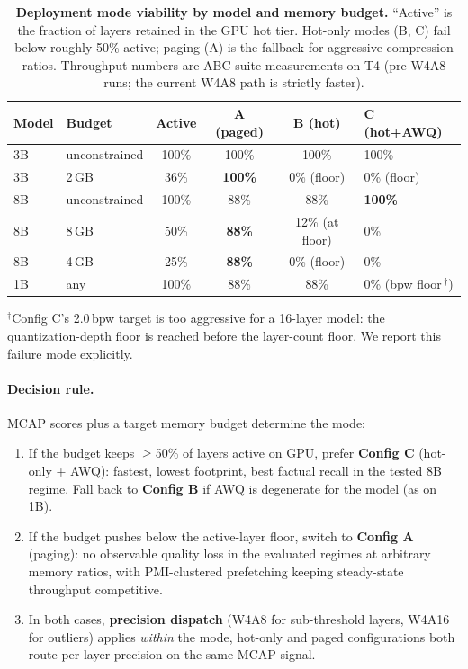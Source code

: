 \documentclass{article}
\begin{document}
\begin{table}[H]
\centering
\caption{\textbf{Deployment mode viability by model and memory budget.} ``Active'' is
the fraction of layers retained in the GPU hot tier. Hot-only modes (B, C) fail below
roughly 50\% active; paging (A) is the fallback for aggressive compression
ratios. Throughput numbers are ABC-suite measurements on T4 (pre-W4A8 runs;
the current W4A8 path is strictly faster).}
\label{tab:deployment_modes_summary}
\small
\begin{tabular}{llcccl}
\toprule
Model & Budget & Active & A (paged) & B (hot) & C (hot+AWQ) \\
\midrule
3B & unconstrained  & 100\% & 100\%  & 100\%  & 100\% \\
3B & 2\,GB          & 36\%  & \textbf{100\%} & 0\% (floor) & 0\% (floor) \\
8B & unconstrained  & 100\% & 88\%   & 88\%   & \textbf{100\%} \\
8B & 8\,GB          & 50\%  & \textbf{88\%}  & 12\% (at floor) & 0\% \\
8B & 4\,GB          & 25\%  & \textbf{88\%}  & 0\% (floor) & 0\% \\
1B & any            & 100\% & 88\%   & 88\%   & 0\% (bpw floor\,$^\dagger$) \\
\bottomrule
\end{tabular}

\smallskip
{\footnotesize $^\dagger$Config C's 2.0\,bpw target is too aggressive for a 16-layer
model: the quantization-depth floor is reached before the layer-count floor.
We report this failure mode explicitly.}
\end{table}

\paragraph{Decision rule.} MCAP scores plus a target memory budget determine the mode:
\begin{enumerate}[leftmargin=*, itemsep=1pt]
\item If the budget keeps $\geq$50\% of layers active on GPU, prefer \textbf{Config C}
  (hot-only + AWQ): fastest, lowest footprint, best factual recall in the tested 8B
  regime. Fall back to \textbf{Config B} if AWQ is degenerate for the model (as on 1B).
\item If the budget pushes below the active-layer floor, switch to \textbf{Config A}
  (paging): no observable quality loss in the evaluated regimes at arbitrary memory ratios, with PMI-clustered
  prefetching keeping steady-state throughput competitive.
\item In both cases, \textbf{precision dispatch} (W4A8 for sub-threshold layers, W4A16
  for outliers) applies \emph{within} the mode, hot-only and paged configurations both
  route per-layer precision on the same MCAP signal.
\end{enumerate}
\end{document}
